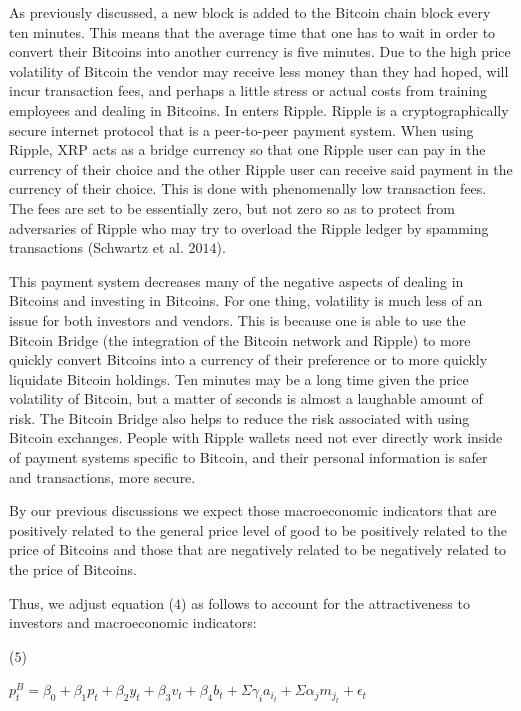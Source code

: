 \documentclass{article}[10 pt]
\newcommand{\vs}{\vspace{0.1in}}
\begin{document}
\vs

As previously discussed, a new block is added to the Bitcoin chain block
every ten minutes. This means that the average time that one has to wait in
order to convert their Bitcoins into another currency is five minutes. Due
to the high price volatility of Bitcoin the vendor may receive less money
than they had hoped, will incur transaction fees, and perhaps a little
stress or actual costs from training employees and dealing in Bitcoins. In
enters Ripple. Ripple is a cryptographically secure internet protocol that
is a peer-to-peer payment system. When using Ripple, XRP acts as a bridge
currency so that one Ripple user can pay in the currency of their choice and
the other Ripple user can receive said payment in the currency of their
choice. This is done with phenomenally low transaction fees. The fees are
set to be essentially zero, but not zero so as to protect from adversaries
of Ripple who may try to overload the Ripple ledger by spamming transactions
(Schwartz et al. $2014$). 

\vs

This payment system decreases many of the negative aspects of dealing in
Bitcoins and investing in Bitcoins. For one thing, volatility is much less
of an issue for both investors and vendors. This is because one is able to
use the Bitcoin Bridge (the integration of the Bitcoin network and Ripple)
to more quickly convert Bitcoins into a currency of their preference or to
more quickly liquidate Bitcoin holdings. Ten minutes may be a long time
given the price volatility of Bitcoin, but a matter of seconds is almost a
laughable amount of risk. The Bitcoin Bridge also helps to reduce the risk
associated with using Bitcoin exchanges. People with Ripple wallets need not
ever directly work inside of payment systems specific to Bitcoin, and their
personal information is safer and transactions, more secure. 

\vs

By our previous discussions we expect those macroeconomic indicators that
are positively related to the general price level of good to be positively
related to the price of Bitcoins and those that are negatively related to be
negatively related to the price of Bitcoins.

\vs

Thus, we adjust equation ($4$) as follows to account for the attractiveness
to investors and macroeconomic indicators:

\vs

($5$) \begin{center} $p_{t}^{B} = \beta_{0} + \beta_{1}p_t + \beta_{2}y_t +
    \beta_{3}v_t + \beta_{4}b_t + \Sigma \gamma_{i}a_{i_t} + \Sigma
    \alpha_{j}m_{j_t}  + \epsilon_t$ \end{center}
\end{document}
